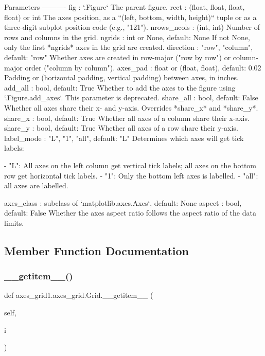 \begin{DoxyVerb}Parameters
----------
fig : `.Figure`
    The parent figure.
rect : (float, float, float, float) or int
    The axes position, as a ``(left, bottom, width, height)`` tuple or
    as a three-digit subplot position code (e.g., "121").
nrows_ncols : (int, int)
    Number of rows and columns in the grid.
ngrids : int or None, default: None
    If not None, only the first *ngrids* axes in the grid are created.
direction : {"row", "column"}, default: "row"
    Whether axes are created in row-major ("row by row") or
    column-major order ("column by column").
axes_pad : float or (float, float), default: 0.02
    Padding or (horizontal padding, vertical padding) between axes, in
    inches.
add_all : bool, default: True
    Whether to add the axes to the figure using `.Figure.add_axes`.
    This parameter is deprecated.
share_all : bool, default: False
    Whether all axes share their x- and y-axis.  Overrides *share_x*
    and *share_y*.
share_x : bool, default: True
    Whether all axes of a column share their x-axis.
share_y : bool, default: True
    Whether all axes of a row share their y-axis.
label_mode : {"L", "1", "all"}, default: "L"
    Determines which axes will get tick labels:

    - "L": All axes on the left column get vertical tick labels;
      all axes on the bottom row get horizontal tick labels.
    - "1": Only the bottom left axes is labelled.
    - "all": all axes are labelled.

axes_class : subclass of `matplotlib.axes.Axes`, default: None
aspect : bool, default: False
    Whether the axes aspect ratio follows the aspect ratio of the data
    limits.
\end{DoxyVerb}
 

\subsection{Member Function Documentation}
\mbox{\label{classaxes__grid1_1_1axes__grid_1_1Grid_ad79f2415eb561d64e509f4e8a54b35e8}} 
\subsubsection{\texorpdfstring{\+\_\+\+\_\+getitem\+\_\+\+\_\+()}{\_\_getitem\_\_()}}
{\footnotesize\ttfamily def axes\+\_\+grid1.\+axes\+\_\+grid.\+Grid.\+\_\+\+\_\+getitem\+\_\+\+\_\+ (\begin{DoxyParamCaption}\item[{}]{self,  }\item[{}]{i }\end{DoxyParamCaption})}

